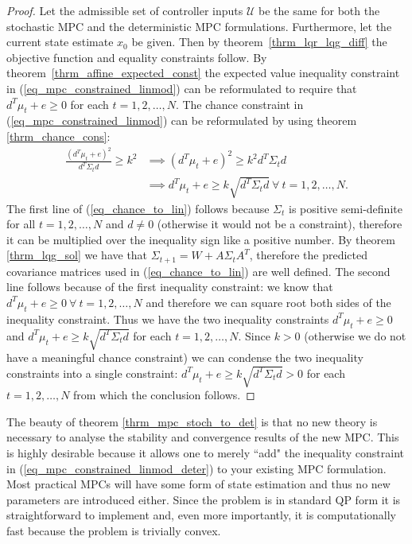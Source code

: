 \begin{proof}
Let the admissible set of controller inputs $\mathcal{U}$ be the same for both the stochastic MPC and the deterministic MPC formulations. Furthermore, let the current state estimate $x_0$ be given. Then by theorem~\ref{thrm_lqr_lqg_diff} the objective function and equality constraints follow. By theorem~\ref{thrm_affine_expected_const} the expected value inequality constraint in (\ref{eq_mpc_constrained_linmod}) can be reformulated to require that $d^T\mu_t + e \geq 0$ for each $t=1, 2,\hdots, N$. The chance constraint in (\ref{eq_mpc_constrained_linmod})  can be reformulated by using theorem \ref{thrm_chance_cons}:
\begin{equation}
\begin{aligned}
\frac{(d^T\mu_t+e)^2}{d^T \Sigma_t d} \geq k^2 &\implies (d^T\mu_t+e)^2 \geq k^2 {d^T \Sigma_t d} \\
&\implies d^T\mu_t+e \geq k \sqrt{d^T \Sigma_t d}~\forall~t=1, 2,\hdots, N.
\end{aligned}
\label{eq_chance_to_lin}
\end{equation}
The first line of (\ref{eq_chance_to_lin}) follows because $\Sigma_t$ is positive semi-definite for all $t=1, 2,\hdots, N$ and $d \neq 0$ (otherwise it would not be a constraint), therefore it can be multiplied over the inequality sign like a positive number. By theorem \ref{thrm_lqg_sol} we have that $\Sigma_{t+1} = W + A\Sigma_tA^T$, therefore the predicted covariance matrices used in (\ref{eq_chance_to_lin}) are well defined. The second line follows because of the first inequality constraint: we know that $d^T\mu_t+e \geq 0 ~\forall~t=1,2,\hdots, N$ and therefore we can square root both sides of the inequality constraint. Thus we have the two inequality constraints $d^T\mu_t+e \geq 0$ and $d^T\mu_t+e \geq k \sqrt{d^T \Sigma_t d}$ for each $t=1,2,\hdots,N$. Since $k > 0$ (otherwise we do not have a meaningful chance constraint) we can condense the two inequality constraints into a single constraint: $d^T\mu_t+e \geq k \sqrt{d^T \Sigma_t d} > 0$ for each $t=1,2,\hdots,N$ from which the conclusion follows.  
\end{proof}
The beauty of theorem \ref{thrm_mpc_stoch_to_det} is that no new theory is necessary to analyse the stability and convergence results of the new MPC. This is highly desirable because it allows one to merely ``add" the inequality constraint in (\ref{eq_mpc_constrained_linmod_deter}) to your existing MPC formulation. Most practical MPCs will have some form of state estimation and thus no new parameters are introduced either. Since the problem is in standard QP form it is straightforward to implement and, even more importantly, it is computationally fast because the problem is trivially convex.

